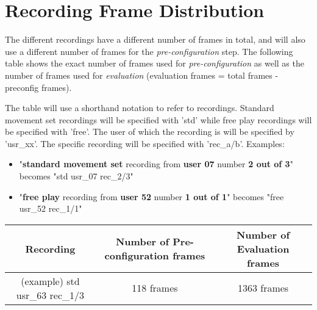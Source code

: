 \chapter{Recording Frame Distribution}
\label{appendix: recording frame distribution}

The different recordings have a different number of frames in total, and will also use a different number of frames for the \textit{pre-configuration} step. 
The following table shows the exact number of frames used for \textit{pre-configuration} as well as the number of frames used for \textit{evaluation} (evaluation frames = total frames - preconfig frames).

The table will use a shorthand notation to refer to recordings.
Standard movement set recordings will be specified with 'std' while free play recordings will be specified with 'free'.
The user of which the recording is will be specified by 'usr\_xx'.
The specific recording will be specified with 'rec\_a/b'.
Examples:
\begin{itemize}
\item "\textbf{standard movement set} recording from \textbf{user 07} number \textbf{2 out of 3}" becomes "std usr\_07 rec\_2/3"
\item "\textbf{free play} recording from \textbf{user 52} number \textbf{1 out of 1}" becomes "free usr\_52 rec\_1/1"
\end{itemize}


\begin{tabular}{|c|c|c|}
    \hline
    Recording & Number of Pre-configuration frames & Number of Evaluation frames \\
    \hline
    (example) std usr\_63 rec\_1/3 & 118 frames & 1363 frames \\
     \hline
\end{tabular}
